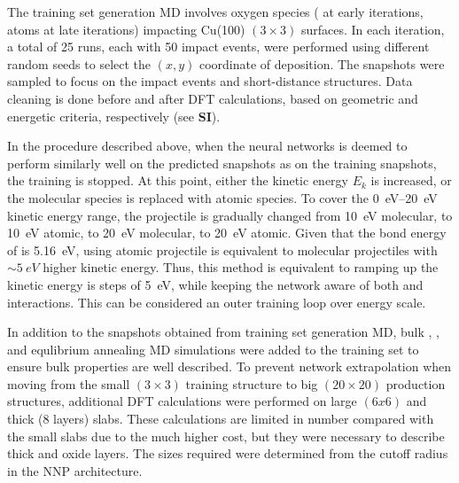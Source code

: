 \documentclass[manuscript=cmatex]{achemso}
\begin{document}
The training set generation MD involves oxygen species ( at early iterations,  atoms at late iterations) impacting Cu(100) $(3\times3)$ surfaces. In each iteration, a total of 25 runs, each with 50 impact events, were performed using different random seeds to select the $(x, y)$ coordinate of  deposition. The snapshots were sampled to focus on the impact events and short-distance structures. Data cleaning is done before and after DFT calculations, based on geometric and energetic criteria, respectively (see \textbf{SI}). 

In the procedure described above, when the neural networks is deemed to perform similarly well on the predicted snapshots as on the training snapshots, the training is stopped. At this point, either the kinetic energy $E_k$ is increased, or the molecular species is replaced with atomic species. To cover the \SIrange{0}{20}{eV} kinetic energy range, the projectile is gradually changed from \SI{10}{eV} molecular, to \SI{10}{eV} atomic, to \SI{20}{eV} molecular, to \SI{20}{eV} atomic. Given that the bond energy of  is \SI{5.16}{eV}, using atomic projectile is equivalent to molecular projectiles with $\sim\SI{5}{eV}$ higher kinetic energy. Thus, this method is equivalent to ramping up the kinetic energy is steps of \SI{5}{eV}, while keeping the network aware of both  and  interactions. This can be considered an outer training loop over energy scale.

In addition to the snapshots obtained from training set generation MD, bulk , , and  equlibrium annealing MD simulations were added to the training set to ensure bulk properties are well described. To prevent network extrapolation when moving from the small $(3\times3)$ training structure to big $(20\times 20)$ production structures, additional DFT calculations were performed on large $(6x6)$ and thick (8 layers) slabs. These calculations are limited in number compared with the small slabs due to the much higher cost, but they were necessary to describe thick  and oxide layers. The sizes required were determined from the cutoff radius in the NNP architecture. 
\end{document}
